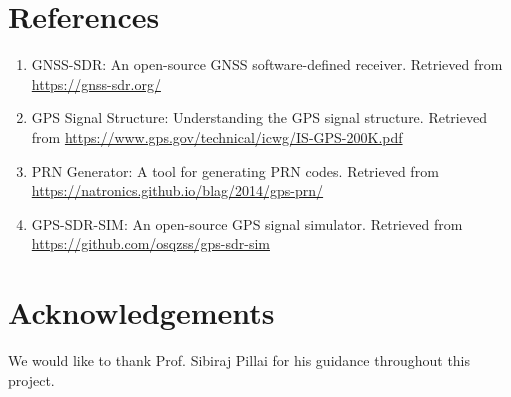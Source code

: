 \documentclass[12pt]{report}
\begin{document}
\section{References}
\begin{enumerate}
    \item \label{ref:gnss_sdr} GNSS-SDR: An open-source GNSS software-defined receiver. Retrieved from \url{https://gnss-sdr.org/}
    \item \label{ref:gps_struct} GPS Signal Structure: Understanding the GPS signal structure. Retrieved from \url{https://www.gps.gov/technical/icwg/IS-GPS-200K.pdf}
    \item \label{ref:prn_generator} PRN Generator: A tool for generating PRN codes. Retrieved from \url{https://natronics.github.io/blag/2014/gps-prn/}
    \item \label{ref:gps_sdr_sim} GPS-SDR-SIM: An open-source GPS signal simulator. Retrieved from \url{https://github.com/osqzss/gps-sdr-sim}
\end{enumerate}

\section{Acknowledgements}
We would like to thank Prof. Sibiraj Pillai for his guidance throughout this project.
\end{document}
